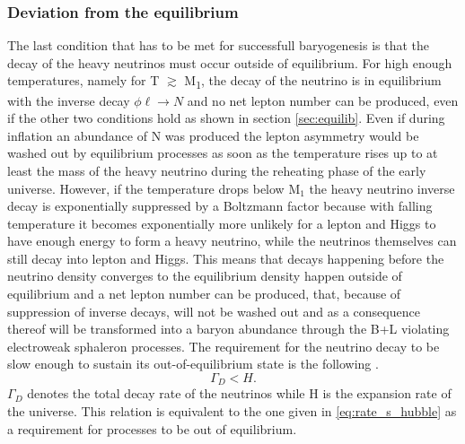\subsubsection{Deviation from the equilibrium}
The last condition that has to be met for successfull baryogenesis is that the decay of the heavy neutrinos must occur outside of equilibrium. For high enough temperatures, namely for T $\gtrsim$ M\textsubscript{1}, the decay of the neutrino is in equilibrium with the inverse decay $\phi\ell\rightarrow N$ and no net lepton number can be produced, even if the other two conditions hold as shown in section \ref{sec:equilib}. Even if during inflation an abundance of N was produced the lepton asymmetry would be washed out by equilibrium processes as soon as the temperature rises up to at least the mass of the heavy neutrino during the reheating phase of the early universe. \newline\indent
However, if the temperature drops below M$_1$ the heavy neutrino inverse decay is exponentially suppressed by a Boltzmann factor because with falling temperature it becomes exponentially more unlikely for a lepton and Higgs to have enough energy to form a heavy neutrino, while the neutrinos themselves can still decay into lepton and Higgs. This means that decays happening before the neutrino density converges to the equilibrium density happen outside of equilibrium and a net lepton number can be produced, that, because of suppression of inverse decays, will not be washed out and as a consequence thereof will be transformed into a baryon abundance through the B+L violating electroweak sphaleron processes.\newline\indent
The requirement for the neutrino decay to be slow enough to sustain its out-of-equilibrium state is the following \cite[p. 30]{Taanila:2008}.
\begin{equation}
	\Gamma_D<H.
	\label{eq:out_of_eq}
\end{equation}
$\Gamma_D$ denotes the total decay rate of the neutrinos while H is the expansion rate of the universe. This relation is equivalent to the one given in \eqref{eq:rate_s_hubble} as a requirement for processes to be out of equilibrium. 